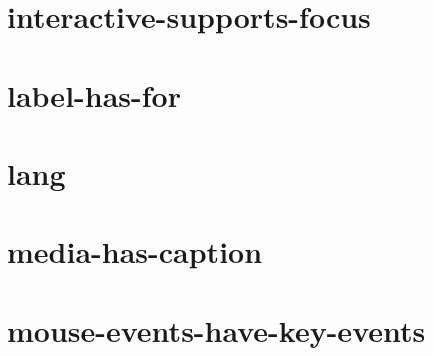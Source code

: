 \documentclass[twoside]{book}
\newcommand{\+}{\discretionary{\mbox{\scriptsize$\hookleftarrow$}}{}{}}
\begin{document}
\chapter{interactive-\/supports-\/focus}
\label{md__c_1_workspace_demo_src_main_script_node_modules_eslint-plugin-jsx-a11y_docs_rules_interactive-supports-focus}

\chapter{label-\/has-\/for}
\label{md__c_1_workspace_demo_src_main_script_node_modules_eslint-plugin-jsx-a11y_docs_rules_label-has-for}

\chapter{lang}
\label{md__c_1_workspace_demo_src_main_script_node_modules_eslint-plugin-jsx-a11y_docs_rules_lang}

\chapter{media-\/has-\/caption}
\label{md__c_1_workspace_demo_src_main_script_node_modules_eslint-plugin-jsx-a11y_docs_rules_media-has-caption}

\chapter{mouse-\/events-\/have-\/key-\/events}
\label{md__c_1_workspace_demo_src_main_script_node_modules_eslint-plugin-jsx-a11y_docs_rules_mouse-events-have-key-events}

\end{document}
